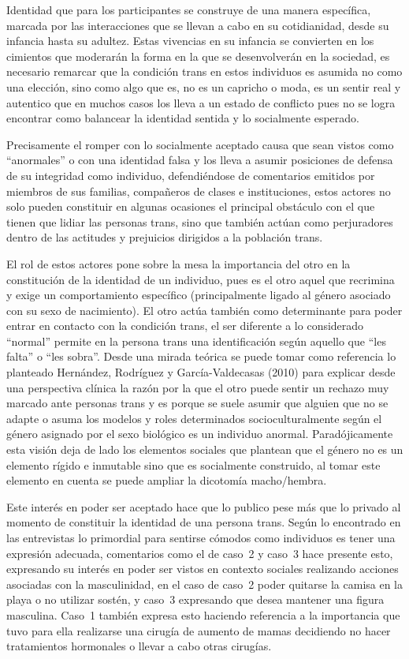 Identidad que para los participantes se construye de una manera específica,
marcada por las interacciones que se llevan a cabo en su cotidianidad, desde su
infancia hasta su adultez.  Estas vivencias en su infancia se convierten en los
cimientos que moderarán la forma en la que se desenvolverán en la sociedad, es
necesario remarcar que la condición trans en estos individuos es asumida no como
una elección, sino como algo que es, no es un capricho o moda, es un sentir real
y autentico que en muchos casos los lleva a un estado de conflicto pues no se
logra encontrar como balancear la identidad sentida y lo socialmente esperado.

Precisamente el romper con lo socialmente aceptado causa que sean vistos como
“anormales” o con una identidad falsa y los lleva a asumir posiciones de defensa
de su integridad como individuo, defendiéndose de comentarios emitidos por
miembros de sus familias, compañeros de clases e instituciones, estos actores no
solo pueden constituir en algunas ocasiones el principal obstáculo con el que
tienen que lidiar las personas trans, sino que también actúan como perjuradores
dentro de las actitudes y prejuicios dirigidos a la población trans.

El rol de estos actores pone sobre la mesa la importancia del otro en la
constitución de la identidad de un individuo, pues es el otro aquel que
recrimina y exige un comportamiento específico (principalmente ligado al género
asociado con su sexo de nacimiento). El otro actúa también como determinante
para poder entrar en contacto con la condición trans, el ser diferente a lo
considerado “normal” permite en la persona trans una identificación según
aquello que “les falta” o “les sobra”. Desde una mirada teórica se puede tomar
como referencia lo planteado Hernández, Rodríguez y García-Valdecasas (2010)
para explicar desde una perspectiva clínica la razón por la que el otro puede
sentir un rechazo muy marcado ante personas trans y es porque se suele asumir
que alguien que no se adapte o asuma los modelos y roles determinados
socioculturalmente según el género asignado por el sexo biológico es un
individuo anormal. Paradójicamente esta visión deja de lado los elementos
sociales que plantean que el género no es un elemento rígido e inmutable sino
que es socialmente construido, al tomar este elemento en cuenta se puede ampliar
la dicotomía macho/hembra.

Este interés en poder ser aceptado hace que lo publico pese más que lo privado
al momento de constituir la identidad de una persona trans. Según lo encontrado
en las entrevistas lo primordial para sentirse cómodos como individuos es tener
una expresión adecuada, comentarios como el de caso~2 y caso~3 hace presente
esto, expresando su interés en poder ser vistos en contexto sociales realizando
acciones asociadas con la masculinidad, en el caso de caso~2 poder quitarse la
camisa en la playa o no utilizar sostén, y caso~3 expresando que desea
mantener una figura masculina. Caso~1 también expresa esto haciendo referencia
a la importancia que tuvo para ella realizarse una cirugía de aumento de mamas
decidiendo no hacer tratamientos hormonales o llevar a cabo otras cirugías.

